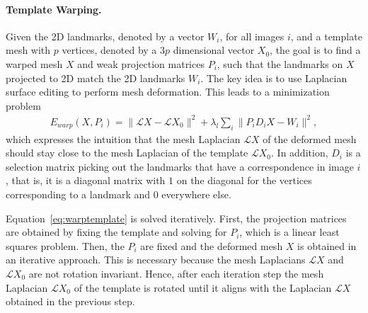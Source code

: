 \paragraph*{Template Warping.} Given the 2D landmarks, denoted by a vector $W_i$, for all images $i$, and a template mesh with $p$ vertices, denoted by a $3p$ dimensional vector $X_0$, the goal is to find a warped mesh $X$ and weak projection matrices $P_i$, such that the landmarks on $X$ projected to 2D match the 2D landmarks $W_i$. The key idea is to use Laplacian surface editing \cite{Sorkine:2004:LSE} to perform mesh deformation. This leads to a minimization problem
%
\begin{align}
\label{eq:warptemplate}
E_{warp}(X,P_{i})=\|\mathcal{L}X - \mathcal{L}X_{0}\|^2+\lambda_{l}\sum_{i}{\|P_{i}D_{i}X-W_{i}\|^2},
\end{align} 
%
which expresses the intuition that the mesh Laplacian \cite{Meyer2003} $\mathcal{L}X$ of the deformed mesh should stay close to the mesh Laplacian of the template $\mathcal{L}X_{0}$. In addition, $D_{i}$ is a selection matrix picking out the landmarks that have a correspondence in image $i$, that is, it is a diagonal matrix with $1$ on the diagonal for the vertices corresponding to a landmark and $0$ everywhere else. 

Equation~\ref{eq:warptemplate} is solved iteratively. First, the projection matrices are obtained by fixing the template and solving for $P_i$, which is a linear least squares problem. Then, the $P_i$ are fixed and the deformed mesh $X$ is obtained in an iterative approach. This is necessary because the mesh Laplacians $\mathcal{L}X$ and $\mathcal{L}X_0$ are not rotation invariant. Hence, after each iteration step the mesh Laplacian $\mathcal{L}X_0$ of the template is rotated until it aligns with the Laplacian $\mathcal{L}X$ obtained in the previous step.

%

